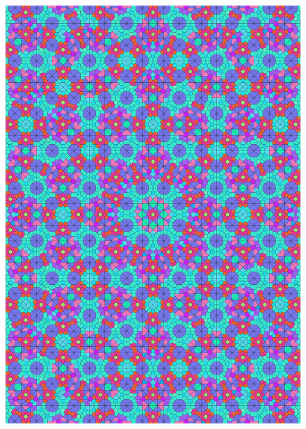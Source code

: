 \documentclass[text.tex]{subfiles}
\begin{document}
\begin{figure}[h!]
\centering
\includegraphics[width=1\textwidth]{img/results/octagon/quasi_polygon-octagon_116421_(-5_4alpha_4).pdf}
\end{figure}
\end{document}
